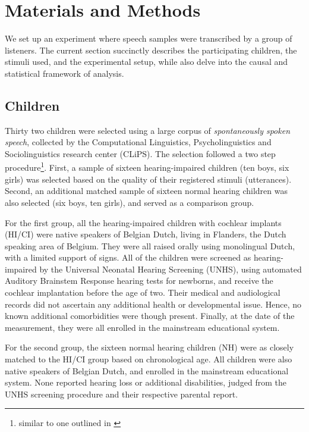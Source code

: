 \section{Materials and Methods}
%
We set up an experiment where speech samples were transcribed by a group of listeners. The current section succinctly describes the participating children, the stimuli used, and the experimental setup, while also delve into the causal and statistical framework of analysis.
%
%
\subsection{Children}
%
Thirty two children were selected using a large corpus of \textit{spontaneously spoken speech}, collected by the Computational Linguistics, Psycholinguistics and Sociolinguistics research center (CLiPS). The selection followed a two step procedure\footnote{similar to one outlined in \citet{Faes_et_al_2021}}. First, a sample of sixteen hearing-impaired children (ten boys, six girls) was selected based on the quality of their registered stimuli (utterances). Second, an additional matched sample of sixteen normal hearing children was also selected (six boys, ten girls), and served as a comparison group.

For the first group, all the hearing-impaired children with cochlear implants (HI/CI) were native speakers of Belgian Dutch, living in Flanders, the Dutch speaking area of Belgium. They were all raised orally using monolingual Dutch, with a limited support of signs. All of the children were screened as hearing-impaired by the Universal Neonatal Hearing Screening (UNHS), using automated Auditory Brainstem Response hearing tests for newborns, and receive the cochlear implantation before the age of two. Their medical and audiological records did not ascertain any additional health or developmental issue. Hence, no known additional comorbidities were though present. Finally, at the date of the measurement, they were all enrolled in the mainstream educational system.

For the second group, the sixteen normal hearing children (NH) were as closely matched to the HI/CI group based on chronological age. All children were also native speakers of Belgian Dutch, and enrolled in the mainstream educational system. None reported hearing loss or additional disabilities, judged from the UNHS screening procedure and their respective parental report.

